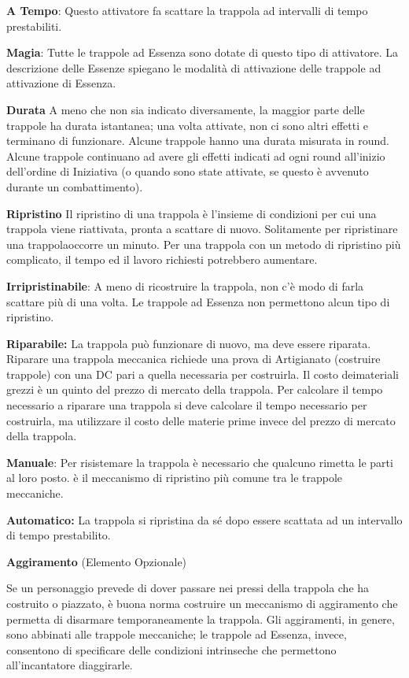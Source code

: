 \documentclass[a4paper,11pt,twoside,openany]{book}
\begin{document}
{\textbf{A Tempo}: Questo attivatore fa scattare la trappola ad intervalli di tempo prestabiliti.

\textbf{Magia}: Tutte le trappole ad Essenza sono dotate di questo tipo di attivatore. La descrizione delle Essenze spiegano le modalità di attivazione delle trappole ad attivazione di Essenza. 

\textbf{Durata}
A meno che non sia indicato diversamente, la maggior parte delle trappole ha durata istantanea; una volta attivate, non ci sono altri effetti e terminano di funzionare. Alcune trappole hanno una durata misurata in round. Alcune trappole continuano ad avere gli effetti indicati ad ogni round all'inizio dell'ordine di Iniziativa (o quando sono state attivate, se questo è avvenuto durante un combattimento).

\textbf{Ripristino}
Il ripristino di una trappola è l'insieme di condizioni per cui una trappola viene riattivata, pronta a scattare di nuovo. Solitamente per ripristinare una trappolaoccorre un minuto. Per una trappola con un metodo di ripristino più complicato, il tempo ed il lavoro richiesti potrebbero aumentare.

\textbf{Irripristinabile}: A meno di ricostruire la trappola, non c'è modo di farla scattare più di una volta. Le trappole ad Essenza non permettono alcun tipo di ripristino.

\textbf{Riparabile:} La trappola può funzionare di nuovo, ma deve essere riparata. Riparare una trappola meccanica richiede una prova di Artigianato (costruire trappole) con una DC pari a quella necessaria per costruirla. Il costo deimateriali grezzi è un quinto del prezzo di mercato della trappola. Per calcolare il tempo necessario a riparare una trappola si deve calcolare il tempo necessario per costruirla, ma utilizzare il costo delle materie prime invece del prezzo di mercato della trappola.

\textbf{Manuale}: Per risistemare la trappola è necessario che qualcuno rimetta le parti al loro posto. è il meccanismo di ripristino più comune tra le trappole meccaniche.

\textbf{Automatico:} La trappola si ripristina da sé dopo essere scattata ad un intervallo di tempo prestabilito.

\textbf{Aggiramento} (Elemento Opzionale)

Se un personaggio prevede di dover passare nei pressi della trappola che ha costruito o piazzato, è buona norma costruire un meccanismo di aggiramento che permetta di disarmare temporaneamente la trappola. Gli aggiramenti, in genere, sono abbinati alle trappole meccaniche; le trappole ad Essenza, invece, consentono di specificare delle condizioni intrinseche che permettono all'incantatore diaggirarle. 

}
\end{document}

